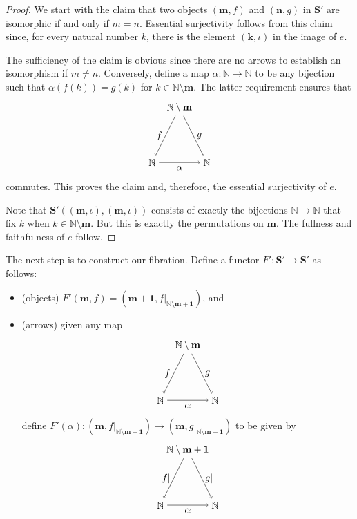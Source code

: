 \documentclass[11pt]{amsart}
\newcommand{\NN}{\mathbb{N}}
\newcommand{\cat}[1]{\mathbf{#1}}
\newcommand{\from}{\colon}
\theoremstyle{remark}
\theoremstyle{definition}
\begin{document}
\begin{proof}
	We start with the claim that two objects $(\mathbf{m},f)$ and $(\mathbf{n},g)$ in $\cat{S}'$ are isomorphic if and only if $m=n$.  Essential surjectivity follows from this claim since, for every natural number $k$, there is the element $(\mathbf{k}, \iota)$ in the image of $e$.
	
	The sufficiency of the claim is obvious since there are no arrows to establish an isomorphism if $m \neq n$.  Conversely, define a map $\alpha \from \NN \to \NN$ to be any bijection such that $\alpha (f(k))=g(k)$ for $k \in \NN \setminus \mathbf{m}$. The latter requirement ensures that 
	\[
	\begin{tikzpicture}
		\node (1) at (0,2) {$\NN \setminus \mathbf{m}$};
		\node (2) at (-1,0) {$\NN$};
		\node (3) at (1,0) {$\NN$};
		\draw [->] (1) to node[left] {$f$} (2);
		\draw [->] (1) to node[right] {$g$} (3);
		\draw [->] (2) to node[below] {$\alpha$} (3);
	\end{tikzpicture}
	\]
	commutes. This proves the claim and, therefore, the essential surjectivity of $e$.
	
	Note that $\cat{S'}((\mathbf{m},\iota),(\mathbf{m},\iota))$ consists of exactly the bijections $\NN \to \NN$ that fix $k$ when $k \in \NN \setminus \mathbf{m}$.  But this is exactly the permutations on $\mathbf{m}$. The fullness and faithfulness of $e$ follow.  
\end{proof}

The next step is to construct our fibration. Define a functor $F' \from \cat{S}' \to \cat{S}'$ as follows:
\begin{itemize}
	\item (objects) $F' (\mathbf{m},f) = (\mathbf{m+1},f|_{\NN \setminus \mathbf{m+1}})$, and 
	\item (arrows) given any map
	\[
	\begin{tikzpicture}
		\node (1) at (0,2) {$\NN \setminus \mathbf{m}$};
		\node (2) at (-1,0) {$\NN$};
		\node (3) at (1,0) {$\NN$};
		\draw [->] (1) to node[left] {$f$} (2);
		\draw [->] (1) to node[right] {$g$} (3);
		\draw [->] (2) to node[below] {$\alpha$} (3);
	\end{tikzpicture}
	\]
	define $F'(\alpha) \from (\mathbf{m},f|_{\NN \setminus \mathbf{m+1}}) \to (\mathbf{m},g|_{\NN \setminus \mathbf{m+1}})$ to be given by
	\[
	\begin{tikzpicture}
		\node (1) at (0,2) {$\NN \setminus \mathbf{m+1}$};
		\node (2) at (-1,0) {$\NN$};
		\node (3) at (1,0) {$\NN$};
		\draw [->] (1) to node[left] {$f|$} (2);
		\draw [->] (1) to node[right] {$g|$} (3);
		\draw [->] (2) to node[below] {$\alpha$} (3);
	\end{tikzpicture}
	\]
\end{itemize}
\end{document}
